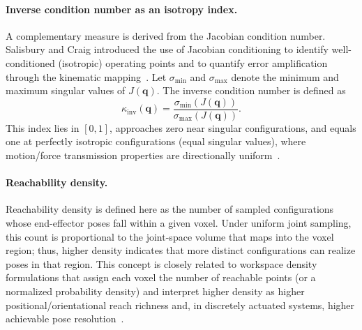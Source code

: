 \paragraph{Inverse condition number as an isotropy index.}
A complementary measure is derived from the Jacobian condition number. Salisbury and Craig introduced the use of Jacobian conditioning to identify well-conditioned (isotropic) operating points and to quantify error amplification through the kinematic mapping~\cite{Salisbury1982ArticulatedHands}. Let $\sigma_{\min}$ and $\sigma_{\max}$ denote the minimum and maximum singular values of $J(\mathbf{q})$. The inverse condition number is defined as
\begin{equation}
\kappa_{\mathrm{inv}}(\mathbf{q}) = \frac{\sigma_{\min}(J(\mathbf{q}))}{\sigma_{\max}(J(\mathbf{q}))}.
\label{eq:inv_condition_number}
\end{equation}
This index lies in $[0,1]$, approaches zero near singular configurations, and equals one at perfectly isotropic configurations (equal singular values), where motion/force transmission properties are directionally uniform~\cite{Salisbury1982ArticulatedHands}.

\paragraph{Reachability density.}
Reachability density is defined here as the number of sampled configurations whose end-effector poses fall within a given voxel. Under uniform joint sampling, this count is proportional to the joint-space volume that maps into the voxel region; thus, higher density indicates that more distinct configurations can realize poses in that region. This concept is closely related to workspace density formulations that assign each voxel the number of reachable points (or a normalized probability density) and interpret higher density as higher positional/orientational reach richness and, in discretely actuated systems, higher achievable pose resolution~\cite{Dong2013WorkspaceDensity}.

